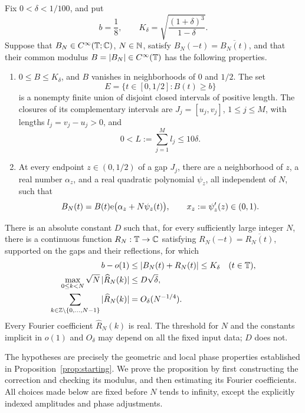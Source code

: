 \begin{proposition}\label{prop:correction}
Fix $0<\delta<1/100$, and put
\[
 b=\frac18,
 \qquad K_\delta=\sqrt{\frac{(1+\delta)^3}{1-\delta}}.
\]
Suppose that $B_N\in C^\infty(\mathbb T;\mathbb C)$, $N\in\mathbb N$, satisfy
$B_N(-t)=\overline{B_N(t)}$, and that their common modulus
$B=|B_N|\in C^\infty(\mathbb T)$ has the following properties.
\begin{enumerate}
\item $0\le B\le K_\delta$, and $B$ vanishes in neighborhoods of $0$ and
  $1/2$.  The set
  \[
    E=\{t\in[0,1/2]:B(t)\ge b\}
  \]
  is a nonempty finite union of disjoint closed intervals of positive length.
  The closures of its complementary intervals are
  $J_j=[u_j,v_j]$, $1\le j\le M$, with lengths $l_j=v_j-u_j>0$, and
  \[
    0<L:=\sum_{j=1}^M l_j\le 10\delta.
  \]
\item At every endpoint $z\in(0,1/2)$ of a gap $J_j$, there are a
  neighborhood of $z$, a real number $\alpha_z$, and a real quadratic
  polynomial $\psi_z$, all independent of $N$, such that
  \[
    B_N(t)=B(t)\mathrm e\bigl(\alpha_z+N\psi_z(t)\bigr),
    \qquad x_z:=\psi_z'(z)\in(0,1).
  \]
\end{enumerate}
There is an absolute constant $D$ such that, for every sufficiently large
integer $N$, there is a continuous function $R_N:\mathbb T\to\mathbb C$ satisfying
$R_N(-t)=\overline{R_N(t)}$, supported on the gaps and their reflections,
for which
\begin{align}
 b-o(1)&\le |B_N(t)+R_N(t)|\le K_\delta
       &&(t\in\mathbb T),\label{eq:corrected-envelope}\\
 \max_{0\le k<N}\sqrt N\,|\widehat R_N(k)|
       &\le D\sqrt\delta,\label{eq:correction-coefficients}\\
 \sum_{k\in\mathbb Z\setminus\{0,\ldots,N-1\}}|\widehat R_N(k)|
       &=O_\delta(N^{-1/4}).\label{eq:correction-tail}
\end{align}
Every Fourier coefficient $\widehat R_N(k)$ is real.  The threshold for $N$
and the constants implicit in $o(1)$ and $O_\delta$ may depend on all the
fixed input data; $D$ does not.
\end{proposition}

The hypotheses are precisely the geometric and local phase properties
established in Proposition~\ref{prop:starting}.  We prove the proposition
by first constructing the correction and checking its modulus, and then
estimating its Fourier coefficients.  All choices made below are fixed
before $N$ tends to infinity, except the explicitly indexed amplitudes and
phase adjustments.

